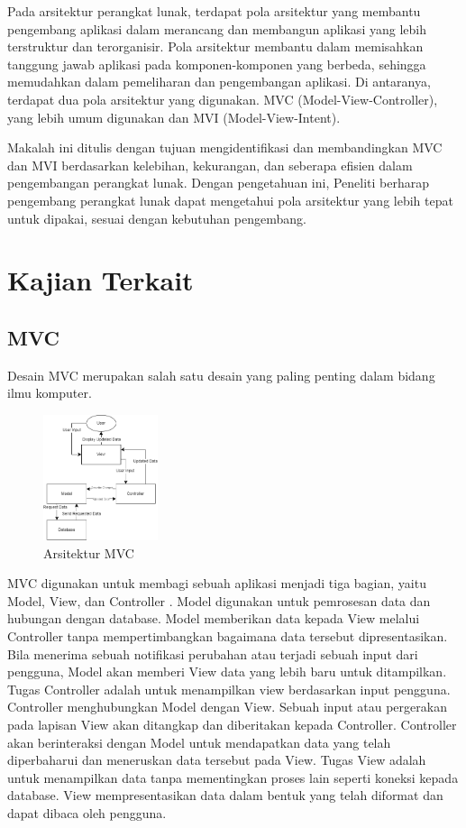\documentclass[conference]{IEEEtran}
\begin{document}
Pada arsitektur perangkat lunak, terdapat pola arsitektur yang membantu pengembang aplikasi dalam merancang dan membangun aplikasi yang lebih terstruktur dan terorganisir. Pola arsitektur membantu dalam memisahkan tanggung jawab aplikasi pada komponen-komponen yang berbeda, sehingga memudahkan dalam pemeliharan dan pengembangan aplikasi. Di antaranya, terdapat dua pola arsitektur yang digunakan. MVC (Model-View-Controller), yang lebih umum digunakan dan MVI (Model-View-Intent).

Makalah ini ditulis dengan tujuan mengidentifikasi dan membandingkan MVC dan MVI berdasarkan kelebihan, kekurangan, dan seberapa efisien dalam pengembangan perangkat lunak. Dengan pengetahuan ini, Peneliti berharap pengembang perangkat lunak dapat mengetahui pola arsitektur yang lebih tepat untuk dipakai, sesuai dengan kebutuhan pengembang.

 

\section{Kajian Terkait}
\subsection{MVC}
Desain MVC merupakan salah satu desain yang paling penting dalam bidang ilmu komputer\cite{bucanek2009model}.
\begin{figure}[h]
    \centering
    \includegraphics[width = 0.3\textwidth
    ]{images/MVC1.png}
    \caption{Arsitektur MVC}
    \label{fig:enter-label}
\end{figure}

MVC digunakan untuk membagi sebuah aplikasi menjadi tiga bagian, yaitu Model, View, dan Controller \cite{qureshi2014comparison}. Model digunakan untuk pemrosesan data dan hubungan dengan database. Model memberikan data kepada View melalui Controller tanpa mempertimbangkan bagaimana data tersebut dipresentasikan. Bila menerima sebuah notifikasi perubahan atau terjadi sebuah input dari pengguna, Model akan memberi View data yang lebih baru untuk ditampilkan. Tugas Controller adalah untuk menampilkan view berdasarkan input pengguna. Controller menghubungkan Model dengan View. Sebuah input atau pergerakan pada lapisan View akan ditangkap dan diberitakan kepada Controller. Controller akan berinteraksi dengan Model untuk mendapatkan data yang telah diperbaharui dan meneruskan data tersebut pada View. Tugas View adalah untuk menampilkan data tanpa mementingkan proses lain seperti koneksi kepada database. View mempresentasikan data dalam bentuk yang telah diformat dan dapat dibaca oleh pengguna.
\end{document}

